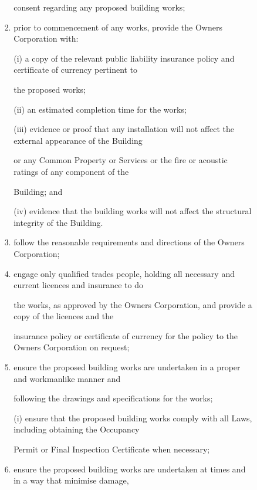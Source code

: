 \documentclass{article}
\begin{document}
\begin{enumerate}[label=\arabic*.]
\begin{enumerate}[label=\arabic{enumi}.\arabic*.]
\begin{enumerate}[label=(\arabic*)]
\begin{enumerate}[label=(\alph*)]
{\fontsize{10.02}{1}consent regarding any proposed building works; }

\item {\fontsize{9.962}{1} prior to commencement of any works, provide the Owners Corporation with: }

{\fontsize{9.962}{1}(i) a copy of the relevant public liability insurance policy and certificate of currency pertinent to }

{\fontsize{10.02}{1}the proposed works; }

{\fontsize{9.962}{1}(ii) an estimated completion time for the works; }

{\fontsize{9.962}{1}(iii) evidence or proof that any installation will not affect the external appearance of the Building }

{\fontsize{10.02}{1}or any Common Property or Services or the fire or acoustic ratings of any component of the }

\newpage

{\fontsize{10.02}{1}Building; and }

{\fontsize{9.962}{1}(iv) evidence that the building works will not affect the structural integrity of the Building. }

\item {\fontsize{9.962}{1} follow the reasonable requirements and directions of the Owners Corporation; }

\item {\fontsize{9.962}{1} engage only qualified trades people, holding all necessary and current licences and insurance to do }

{\fontsize{10.02}{1}the works, as approved by the Owners Corporation, and provide a copy of the licences and the }

{\fontsize{10.02}{1}insurance policy or certificate of currency for the policy to the Owners Corporation on request; }

\item {\fontsize{9.962}{1} ensure the proposed building works are undertaken in a proper and workmanlike manner and }

{\fontsize{10.02}{1}following the drawings and specifications for the works; }

{\fontsize{9.962}{1}(i) ensure that the proposed building works comply with all Laws, including obtaining the Occupancy }

{\fontsize{10.02}{1}Permit or Final Inspection Certificate when necessary; }

\item {\fontsize{9.962}{1} ensure the proposed building works are undertaken at times and in a way that minimise damage, }


\end{enumerate}
\end{enumerate}
\end{enumerate}
\end{enumerate}
\end{document}
